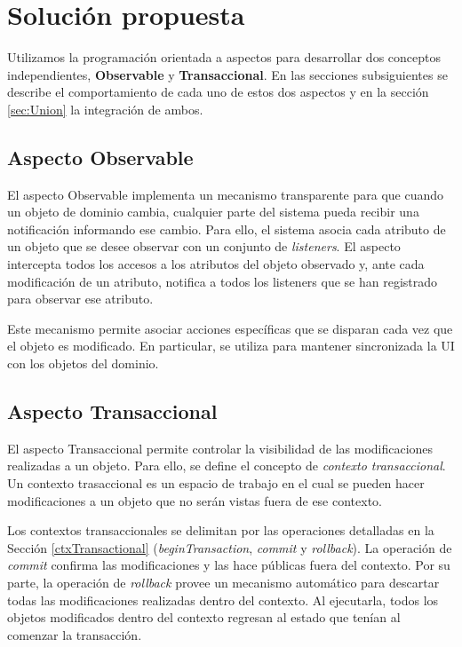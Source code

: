 \section{Solución propuesta}
\label{sec:Solucion}

	Utilizamos la programación orientada a aspectos para desarrollar dos
	conceptos independientes, {\bf Observable} y  {\bf Transaccional}.
	En las secciones subsiguientes se describe el comportamiento de cada uno de
	estos dos aspectos y en la sección \ref{sec:Union} la integración de ambos.

	\subsection{Aspecto Observable}
	\label{aspectoObservable}
		El aspecto Observable implementa un mecanismo transparente para que cuando un
		objeto de dominio cambia, cualquier parte del sistema pueda recibir una
		notificación informando ese cambio.
		Para ello, el sistema asocia cada atributo de un objeto que se desee observar
		con un conjunto de \emph{listeners}. 
		El aspecto intercepta todos los accesos a los atributos
		del objeto observado y, ante cada modificación de un atributo, notifica a todos
		los listeners que se han registrado para observar ese atributo.
		
		Este mecanismo permite asociar acciones específicas que se disparan cada vez
		que el objeto es modificado. En particular, se utiliza para mantener
		sincronizada la UI con los objetos del dominio.

	\subsection{Aspecto Transaccional}
	\label{aspectoTransaccional}
		El aspecto Transaccional permite controlar la visibilidad de las modificaciones
		realizadas a un objeto.
		Para ello, se define el concepto de \emph{contexto transaccional}.
		Un contexto trasaccional es un espacio de trabajo en el cual se pueden
		hacer modificaciones a un objeto que no serán vistas fuera de ese contexto.
	
		Los contextos transaccionales se delimitan por las
		operaciones detalladas en la Sección \ref{ctxTransactional}
		(\emph{beginTransaction}, \emph{commit} y \emph{rollback}).
		La operación de \emph{commit} confirma las modificaciones y las hace públicas
		fuera del contexto.
		Por su parte, la operación de \emph{rollback} provee un
		mecanismo automático para descartar todas las modificaciones realizadas
		dentro del contexto.
		Al ejecutarla, todos los objetos modificados dentro del contexto regresan al
		estado que tenían al comenzar la transacción.
		 
